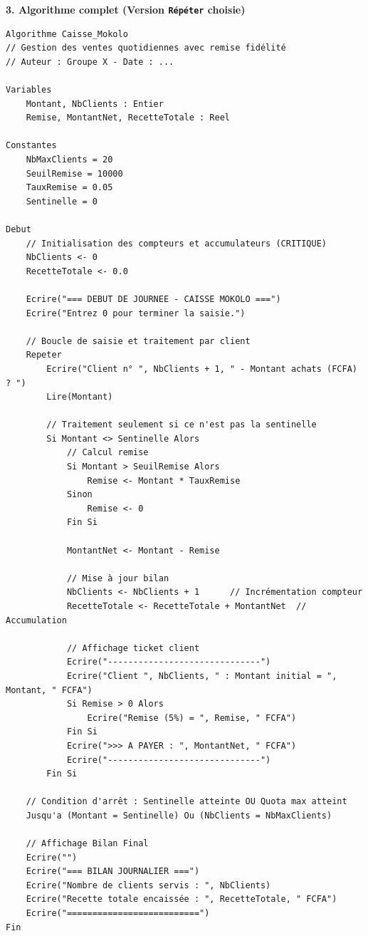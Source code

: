 \documentclass[11pt]{article}
\begin{document}
\begin{exoresolu}
\textbf{3. Algorithme complet (Version \texttt{Répéter} choisie)}\par
\begin{lstlisting}
Algorithme Caisse_Mokolo
// Gestion des ventes quotidiennes avec remise fidélité
// Auteur : Groupe X - Date : ...

Variables
    Montant, NbClients : Entier
    Remise, MontantNet, RecetteTotale : Reel

Constantes
    NbMaxClients = 20
    SeuilRemise = 10000
    TauxRemise = 0.05
    Sentinelle = 0

Debut
    // Initialisation des compteurs et accumulateurs (CRITIQUE)
    NbClients <- 0
    RecetteTotale <- 0.0

    Ecrire("=== DEBUT DE JOURNEE - CAISSE MOKOLO ===")
    Ecrire("Entrez 0 pour terminer la saisie.")

    // Boucle de saisie et traitement par client
    Repeter
        Ecrire("Client n° ", NbClients + 1, " - Montant achats (FCFA) ? ")
        Lire(Montant)

        // Traitement seulement si ce n'est pas la sentinelle
        Si Montant <> Sentinelle Alors
            // Calcul remise
            Si Montant > SeuilRemise Alors
                Remise <- Montant * TauxRemise
            Sinon
                Remise <- 0
            Fin Si

            MontantNet <- Montant - Remise

            // Mise à jour bilan
            NbClients <- NbClients + 1      // Incrémentation compteur
            RecetteTotale <- RecetteTotale + MontantNet  // Accumulation

            // Affichage ticket client
            Ecrire("------------------------------")
            Ecrire("Client ", NbClients, " : Montant initial = ", Montant, " FCFA")
            Si Remise > 0 Alors
                Ecrire("Remise (5%) = ", Remise, " FCFA")
            Fin Si
            Ecrire(">>> A PAYER : ", MontantNet, " FCFA")
            Ecrire("------------------------------")
        Fin Si

    // Condition d'arrêt : Sentinelle atteinte OU Quota max atteint
    Jusqu'a (Montant = Sentinelle) Ou (NbClients = NbMaxClients)

    // Affichage Bilan Final
    Ecrire("")
    Ecrire("=== BILAN JOURNALIER ===")
    Ecrire("Nombre de clients servis : ", NbClients)
    Ecrire("Recette totale encaissée : ", RecetteTotale, " FCFA")
    Ecrire("==========================")
Fin
\end{lstlisting}


\end{exoresolu}
\end{document}
